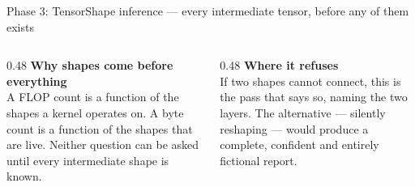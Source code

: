 \documentclass[aspectratio=169,11pt]{beamer}
\newcommand{\subtle}[1]{{\footnotesize\color{nxSlate}#1}}
\begin{document}
\begin{frame}{Phase 3: Tensor}{Shape inference --- every intermediate tensor, before any of them exists}
  \vspace{0.5cm}
  \begin{columns}[T]
    \begin{column}{0.48\textwidth}
      {\bfseries Why shapes come before everything}\\[5pt]
      \subtle{A FLOP count is a function of the shapes a kernel operates on. A
      byte count is a function of the shapes that are live. Neither question can
      be asked until every intermediate shape is known.}
    \end{column}
    \begin{column}{0.48\textwidth}
      {\bfseries Where it refuses}\\[5pt]
      \subtle{If two shapes cannot connect, this is the pass that says so, naming
      the two layers. The alternative --- silently reshaping --- would produce a
      complete, confident and entirely fictional report.}
    \end{column}
  \end{columns}
\end{frame}
\end{document}
